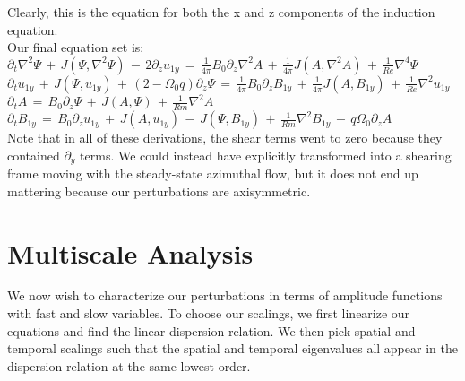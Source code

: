 \documentclass[letterpaper,12pt]{article}
\newcommand\reye{\mathrel{Re}}
\newcommand\reym{\mathrel{Rm}}
\begin{document}
Clearly, this is the equation for both the x and z components of the induction equation. \\

Our final equation set is: \\

$\partial_t \nabla^2 \Psi \, + \, J\left(\Psi, \nabla^2 \Psi\right) \, - \, 2 \partial_z u_{1y} \, = \, \frac{1}{4\pi} B_0 \partial_z \nabla^2 A \, + \, \frac{1}{4\pi}J\left(A, \nabla^2 A \right) \, + \, \frac{1}{\reye}\nabla^4 \Psi$ \\

$\partial_t u_{1y} \, + \, J\left(\Psi, u_{1y}\right) \, + \, \left(2 - \Omega_0 q\right) \partial_z \Psi \, = \, \frac{1}{4\pi}B_0\partial_z B_{1y} \, + \, \frac{1}{4\pi} J\left(A, B_{1y}\right) \, + \, \frac{1}{\reye} \nabla^2 u_{1y}$ \\

$\partial_t A \, = \, B_0 \partial_z \Psi \, + \, J\left(A, \Psi\right) \, + \, \frac{1}{\reym} \nabla^2 A$ \\

$\partial_t B_{1y} \, = \, B_0 \partial_z u_{1y} \, + \, J\left(A, u_{1y}\right) \, - \, J\left(\Psi, B_{1y}\right) \, + \, \frac{1}{\reym} \nabla^2 B_{1y}  \, - \, q \Omega_0 \partial_z A$ \\

Note that in all of these derivations, the shear terms went to zero because they contained $\partial_y$ terms. We could instead have explicitly transformed into a shearing frame moving with the steady-state azimuthal flow, but it does not end up mattering because our perturbations are axisymmetric. \\

\section*{Multiscale Analysis}

We now wish to characterize our perturbations in terms of amplitude functions with fast and slow variables. To choose our scalings, we first linearize our equations and find the linear dispersion relation. We then pick spatial and temporal scalings such that the spatial and temporal eigenvalues all appear in the dispersion relation at the same lowest order. \\
\end{document}
